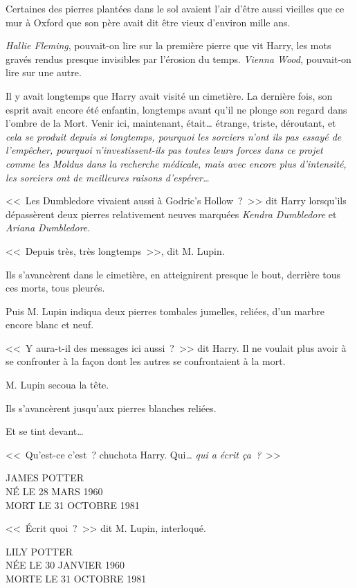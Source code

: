 Certaines des pierres plantées dans le sol avaient l'air d'être aussi vieilles que ce mur à Oxford que son père avait dit être vieux d'environ mille ans.

\emph{Hallie Fleming}, pouvait-on lire sur la première pierre que vit Harry, les mots gravés rendus presque invisibles par l'érosion du temps. \emph{Vienna Wood}, pouvait-on lire sur une autre.

Il y avait longtemps que Harry avait visité un cimetière. La dernière fois, son esprit avait encore été enfantin, longtemps avant qu'il ne plonge son regard dans l'ombre de la Mort. Venir ici, maintenant, était… étrange, triste, déroutant, et \emph{cela se produit depuis si longtemps, pourquoi les sorciers n'ont ils pas essayé de l'empêcher, pourquoi n'investissent-ils pas toutes leurs forces dans ce projet comme les Moldus dans la recherche médicale, mais avec encore plus d'intensité, les sorciers ont de meilleures raisons d'espérer…}

<<~Les Dumbledore vivaient aussi à Godric's Hollow~?~>> dit Harry lorsqu'ils dépassèrent deux pierres relativement neuves marquées \emph{Kendra Dumbledore} et \emph{Ariana Dumbledore}.

<<~Depuis très, très longtemps~>>, dit M. Lupin.

Ils s'avancèrent dans le cimetière, en atteignirent presque le bout, derrière tous ces morts, tous pleurés.

Puis M. Lupin indiqua deux pierres tombales jumelles, reliées, d'un marbre encore blanc et neuf.

<<~Y aura-t-il des messages ici aussi~?~>> dit Harry. Il ne voulait plus avoir à se confronter à la façon dont les autres se confrontaient à la mort.

M. Lupin secoua la tête.

Ils s'avancèrent jusqu'aux pierres blanches reliées.

Et se tint devant…

<<~Qu'est-ce c'est~? chuchota Harry. Qui… \emph{qui a écrit ça~?}~>>
\begin{center}
JAMES POTTER\\
NÉ LE 28 MARS 1960\\
MORT LE 31 OCTOBRE 1981
\end{center}

<<~Écrit quoi~?~>> dit M. Lupin, interloqué.

\begin{center}
LILY POTTER\\
NÉE LE 30 JANVIER 1960\\
MORTE LE 31 OCTOBRE 1981
\end{center}

